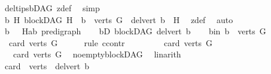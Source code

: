 \begin{isabellebody}
\ del{\isacharunderscore}{\kern0pt}tips{\isacharunderscore}{\kern0pt}bDAG\ z{\isacharunderscore}{\kern0pt}def\ \isamarkupfalse%
\ simp\isanewline
\ \ \isamarkupfalse%
\ \isamarkupfalse%
\ {\isachardoublequoteopen}{\isacharparenleft}{\kern0pt}{\isasymexists}b\ H{\isachardot}{\kern0pt}\ blockDAG\ H\ {\isasymand}\ b\ {\isasymin}\ verts\ G\ {\isasymand}\ del{\isacharunderscore}{\kern0pt}vert\ b\ {\isacharequal}{\kern0pt}\ H{\isacharparenright}{\kern0pt}{\isachardoublequoteclose}\ \isamarkupfalse%
\ z{\isacharunderscore}{\kern0pt}def\ \isamarkupfalse%
\ auto\isanewline
{}\isamarkupfalse%
\ \isanewline
\ \ \isamarkupfalse%
\ b\ \ \ H{\isacharcolon}{\kern0pt}{\isacharcolon}{\kern0pt}{\isachardoublequoteopen}{\isacharparenleft}{\kern0pt}{\isacharprime}{\kern0pt}a{\isacharcomma}{\kern0pt}{\isacharprime}{\kern0pt}b{\isacharparenright}{\kern0pt}\ pre{\isacharunderscore}{\kern0pt}digraph{\isachardoublequoteclose}\isanewline
\ \ \isamarkupfalse%
\ bD{\isacharcolon}{\kern0pt}\ {\isachardoublequoteopen}blockDAG\ {\isacharparenleft}{\kern0pt}del{\isacharunderscore}{\kern0pt}vert\ b{\isacharparenright}{\kern0pt}{\isachardoublequoteclose}\isanewline
\ \ \isamarkupfalse%
\ b{\isacharunderscore}{\kern0pt}in{\isacharcolon}{\kern0pt}\ {\isachardoublequoteopen}b\ {\isasymin}\ verts\ G{\isachardoublequoteclose}\isanewline
\ \ \isamarkupfalse%
\ \ {\isachardoublequoteopen}card\ {\isacharparenleft}{\kern0pt}verts\ G{\isacharparenright}{\kern0pt}\ {\isachargreater}{\kern0pt}\ {}{\isachardoublequoteclose}\isanewline
\ \ \isamarkupfalse%
\ {\isacharparenleft}{\kern0pt}rule\ ccontr{\isacharparenright}{\kern0pt}\isanewline
\ \ \ \ \isamarkupfalse%
\ {\isachardoublequoteopen}{\isasymnot}\ {}\ {\isacharless}{\kern0pt}\ card\ {\isacharparenleft}{\kern0pt}verts\ G{\isacharparenright}{\kern0pt}{\isachardoublequoteclose}\isanewline
\ \ \ \ \isamarkupfalse%
\ \isamarkupfalse%
\ {\isachardoublequoteopen}{}\ {\isacharequal}{\kern0pt}\ card\ {\isacharparenleft}{\kern0pt}verts\ G{\isacharparenright}{\kern0pt}{\isachardoublequoteclose}\ \isamarkupfalse%
\ no{\isacharunderscore}{\kern0pt}empty{\isacharunderscore}{\kern0pt}blockDAG\ \isamarkupfalse%
\ linarith\isanewline
\ \ \ \ \isamarkupfalse%
\ \isamarkupfalse%
\ {\isachardoublequoteopen}card\ {\isacharparenleft}{\kern0pt}\ verts\ {\isacharparenleft}{\kern0pt}\ del{\isacharunderscore}{\kern0pt}vert\ b{\isacharparenright}{\kern0pt}{\isacharparenright}{\kern0pt}\ {\isacharequal}{\kern0pt}\ {}{\isachardoublequoteclose}\ \isamarkupfalse%

\end{isabellebody}
